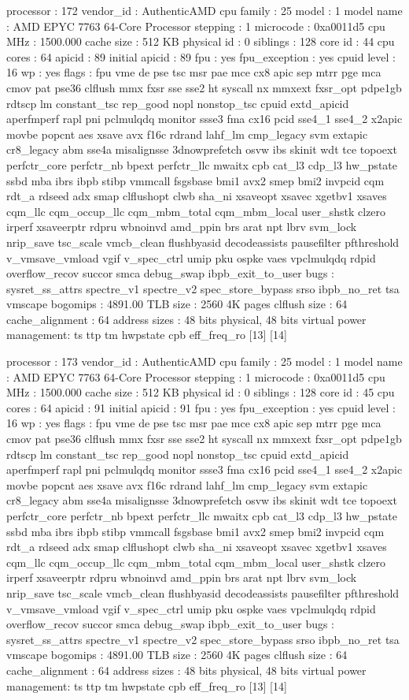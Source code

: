 processor	: 172
vendor_id	: AuthenticAMD
cpu family	: 25
model		: 1
model name	: AMD EPYC 7763 64-Core Processor
stepping	: 1
microcode	: 0xa0011d5
cpu MHz		: 1500.000
cache size	: 512 KB
physical id	: 0
siblings	: 128
core id		: 44
cpu cores	: 64
apicid		: 89
initial apicid	: 89
fpu		: yes
fpu_exception	: yes
cpuid level	: 16
wp		: yes
flags		: fpu vme de pse tsc msr pae mce cx8 apic sep mtrr pge mca cmov pat pse36 clflush mmx fxsr sse sse2 ht syscall nx mmxext fxsr_opt pdpe1gb rdtscp lm constant_tsc rep_good nopl nonstop_tsc cpuid extd_apicid aperfmperf rapl pni pclmulqdq monitor ssse3 fma cx16 pcid sse4_1 sse4_2 x2apic movbe popcnt aes xsave avx f16c rdrand lahf_lm cmp_legacy svm extapic cr8_legacy abm sse4a misalignsse 3dnowprefetch osvw ibs skinit wdt tce topoext perfctr_core perfctr_nb bpext perfctr_llc mwaitx cpb cat_l3 cdp_l3 hw_pstate ssbd mba ibrs ibpb stibp vmmcall fsgsbase bmi1 avx2 smep bmi2 invpcid cqm rdt_a rdseed adx smap clflushopt clwb sha_ni xsaveopt xsavec xgetbv1 xsaves cqm_llc cqm_occup_llc cqm_mbm_total cqm_mbm_local user_shstk clzero irperf xsaveerptr rdpru wbnoinvd amd_ppin brs arat npt lbrv svm_lock nrip_save tsc_scale vmcb_clean flushbyasid decodeassists pausefilter pfthreshold v_vmsave_vmload vgif v_spec_ctrl umip pku ospke vaes vpclmulqdq rdpid overflow_recov succor smca debug_swap ibpb_exit_to_user
bugs		: sysret_ss_attrs spectre_v1 spectre_v2 spec_store_bypass srso ibpb_no_ret tsa vmscape
bogomips	: 4891.00
TLB size	: 2560 4K pages
clflush size	: 64
cache_alignment	: 64
address sizes	: 48 bits physical, 48 bits virtual
power management: ts ttp tm hwpstate cpb eff_freq_ro [13] [14]

processor	: 173
vendor_id	: AuthenticAMD
cpu family	: 25
model		: 1
model name	: AMD EPYC 7763 64-Core Processor
stepping	: 1
microcode	: 0xa0011d5
cpu MHz		: 1500.000
cache size	: 512 KB
physical id	: 0
siblings	: 128
core id		: 45
cpu cores	: 64
apicid		: 91
initial apicid	: 91
fpu		: yes
fpu_exception	: yes
cpuid level	: 16
wp		: yes
flags		: fpu vme de pse tsc msr pae mce cx8 apic sep mtrr pge mca cmov pat pse36 clflush mmx fxsr sse sse2 ht syscall nx mmxext fxsr_opt pdpe1gb rdtscp lm constant_tsc rep_good nopl nonstop_tsc cpuid extd_apicid aperfmperf rapl pni pclmulqdq monitor ssse3 fma cx16 pcid sse4_1 sse4_2 x2apic movbe popcnt aes xsave avx f16c rdrand lahf_lm cmp_legacy svm extapic cr8_legacy abm sse4a misalignsse 3dnowprefetch osvw ibs skinit wdt tce topoext perfctr_core perfctr_nb bpext perfctr_llc mwaitx cpb cat_l3 cdp_l3 hw_pstate ssbd mba ibrs ibpb stibp vmmcall fsgsbase bmi1 avx2 smep bmi2 invpcid cqm rdt_a rdseed adx smap clflushopt clwb sha_ni xsaveopt xsavec xgetbv1 xsaves cqm_llc cqm_occup_llc cqm_mbm_total cqm_mbm_local user_shstk clzero irperf xsaveerptr rdpru wbnoinvd amd_ppin brs arat npt lbrv svm_lock nrip_save tsc_scale vmcb_clean flushbyasid decodeassists pausefilter pfthreshold v_vmsave_vmload vgif v_spec_ctrl umip pku ospke vaes vpclmulqdq rdpid overflow_recov succor smca debug_swap ibpb_exit_to_user
bugs		: sysret_ss_attrs spectre_v1 spectre_v2 spec_store_bypass srso ibpb_no_ret tsa vmscape
bogomips	: 4891.00
TLB size	: 2560 4K pages
clflush size	: 64
cache_alignment	: 64
address sizes	: 48 bits physical, 48 bits virtual
power management: ts ttp tm hwpstate cpb eff_freq_ro [13] [14]

